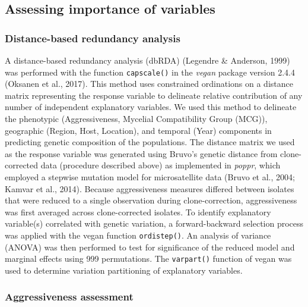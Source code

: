 \documentclass[fleqn,10pt,lineno]{wlpeerj} %
\theoremstyle{definition}
\theoremstyle{definition}
\theoremstyle{definition}
\theoremstyle{remark}
\begin{document}
\subsection*{Assessing importance of
variables}\label{assessing-importance-of-variables}

\subsubsection*{Distance-based redundancy
analysis}\label{distance-based-redundancy-analysis}

A distance-based redundancy analysis (dbRDA) (Legendre \& Anderson,
1999) was performed with the function \texttt{capscale()} in the
\emph{vegan} package version 2.4.4 (Oksanen et al., 2017). This method
uses constrained ordinations on a distance matrix representing the
response variable to delineate relative contribution of any number of
independent explanatory variables. We used this method to delineate the
phenotypic (Aggressiveness, Mycelial Compatibility Group (MCG)),
geographic (Region, Host, Location), and temporal (Year) components in
predicting genetic composition of the populations. The distance matrix
we used as the response variable was generated using Bruvo's genetic
distance from clone-corrected data (procedure described above) as
implemented in \emph{poppr}, which employed a stepwise mutation model
for microsatellite data (Bruvo et al., 2004; Kamvar et al., 2014).
Because aggressiveness measures differed between isolates that were
reduced to a single observation during clone-correction, aggressiveness
was first averaged across clone-corrected isolates. To identify
explanatory variable(s) correlated with genetic variation, a
forward-backward selection process was applied with the vegan function
\texttt{ordistep()}. An analysis of variance (ANOVA) was then performed
to test for significance of the reduced model and marginal effects using
999 permutations. The \texttt{varpart()} function of vegan was used to
determine variation partitioning of explanatory variables.

\subsubsection*{Aggressiveness
assessment}\label{aggressiveness-assessment}
\end{document}
